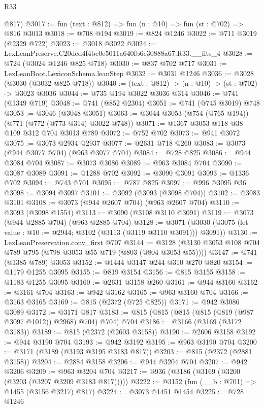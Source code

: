 \begin{lexlean}{R33}
\begin{coremodule}
      @817)
@3017 := fun (text : @812) => fun (n : @10) => fun (st : @702) => @816 @3013
@3018 := @708 @194
@3019 := @824 @1246
@3022 := @711 @3019 (@2329 @722)
@3023 := @3018 @3022
@3024 := LexLeanPreserve.C20ded4f4be0e5011a640fb6c30888a67.R33.__fits_4
@3028 := @724 (@3024 @1246 @825 @718)
@3030 := @837 @702 @717
@3031 := LexLeanBoot.LexiconSchema.leanStep
@3032 := @3031 @1246
@3036 := @3028 (@3030 (@3032 @825 @718))
@3040 := (text : @812) -> (n : @10) -> (st : @702) -> @3023 @3036
@3044 := @735 @194 @3022 @3036 @314
@3046 := @741 (@1349 @719)
@3048 := @741 (@852 @2304)
@3051 := @741 (@745 @3019) @748
@3053 := @3046 (@3048 @3051)
@3063 := @3044 @3053 (@754 (@765 @194)) (@771 (@772 (@773 @314) @3022 @748))
@3071 := @1367 @3053 @118 @38 @109 @312 @704 @3013 @789
@3072 := @752 @702
@3073 := @941 @3072
@3075 := @3073 @2934 @2937
@3077 := @2631 @718 @260
@3083 := @3073 (@944 @3077 @704) (@963 @3077 @704)
@3084 := @728 @825
@3086 := @944 @3084 @704
@3087 := @3073 @3086
@3089 := @963 @3084 @704
@3090 := @3087 @3089
@3091 := @1288 @702
@3092 := @3090 @3091
@3093 := @1336 @702
@3094 := @743 @701
@3095 := @787 @825
@3097 := @996 @3095 @36
@3098 := @3094 @3097
@3101 := @3092 (@3093 (@3098 @704))
@3102 := @3083 @3101
@3108 := @3073 (@944 @2607 @704) (@963 @2607 @704)
@3110 := @3093 (@3098 @1554)
@3113 := @3090 (@3108 @3110 @3091)
@3119 := @3073 (@944 @2885 @704) (@963 @2885 @704)
@3128 := @3071 (@3030 (@3075 (let value : @10 := @2944; @3102 (@3113 (@3119 @3110 @3091))) @3091))
@3130 := LexLeanPreservation.conv_first @707
@3144 := @3128 (@3130 @3053 @108 @704 @789 @795 (@798 @3053 @55 @719 (@803 (@804 @3053 @55))))
@3147 := @741 (@1385 @789) @3053
@3152 := @1444 @3147 @244 @310 @270 @820
@3154 := @1179 @1255 @3095
@3155 := @819 @3154
@3156 := @815 @3155
@3158 := @1183 @1255 @3095
@3160 := @2631 @3158 @260
@3161 := @944 @3160
@3162 := @3161 @704
@3163 := @942 @3162
@3165 := @963 @3160 @704
@3166 := @3163 @3165
@3169 := @815 (@2372 (@725 @825))
@3171 := @942 @3086 @3089
@3172 := @3171 @817
@3183 := @815 (@815 (@815 (@815 (@819 (@987 @3097 @1012)) @2968) @704) @704) @704
@3186 := @3166 (@3169 (@3172 @3183))
@3189 := @815 (@2372 (@2603 @3158))
@3190 := @2606 @3158
@3192 := @944 @3190 @704
@3193 := @942 @3192
@3195 := @963 @3190 @704
@3200 := @3171 (@3189 (@3193 @3195 @3183 @817))
@3203 := @815 (@2372 (@2881 @3158))
@3204 := @2884 @3158
@3206 := @944 @3204 @704
@3207 := @942 @3206
@3209 := @963 @3204 @704
@3217 := @936 (@3186 (@3169 (@3200 (@3203 (@3207 @3209 @3183 @817)))))
@3222 := @3152 (fun (__b : @701) => @1455 (@3156 @3217) @817)
@3224 := @3073 @1451 @1454
@3225 := @728 @1246

\end{coremodule}
\end{lexlean}
